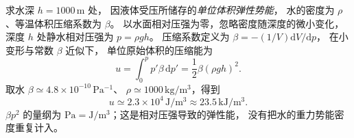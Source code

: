 求水深 $h=1000\,\mathrm m$ 处，
因液体受压所储存的\emph{单位体积弹性势能}，
水的密度为 $\rho$、等温体积压缩系数为 $\beta$。
\exsolution
以水面相对压强为零，忽略密度随深度的微小变化，
深度 $h$ 处静水相对压强为 $p=\rho gh$。
压缩系数定义为
$\beta=-(1/V)\mathrm dV/\mathrm dp$，
在小变形与常数 $\beta$ 近似下，
单位原始体积的压缩能为
\[
u=\int_0^{p}p'\beta\,\mathrm dp'
=\boxed{\frac12\beta(\rho gh)^2}.
\]
取水 $\beta\simeq4.8\times10^{-10}\,\mathrm{Pa^{-1}}$、
$\rho\simeq1000\,\mathrm{kg/m^3}$，得到
\[
\boxed{u\simeq2.3\times10^4\,\mathrm{J/m^3}
\approx23.5\,\mathrm{kJ/m^3}}.
\]
\excheck $\beta p^2$ 的量纲为
$\mathrm{Pa}=\mathrm{J/m^3}$；这是相对压强导致的弹性能，
没有把水的重力势能密度重复计入。
